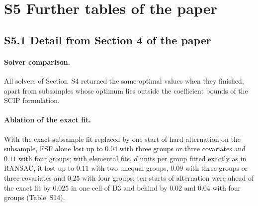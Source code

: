 \clearpage
\section*{S5 Further tables of the paper}

\begin{table}[htbp]
\centering
\small
\caption{Mean flagged fraction $\hat\alpha$ of ESF, by design and fraction of
outliers $\varepsilon$.}
\label{tab:ahat}

\end{table}

\begin{table}[htbp]
\centering
\small
\caption{Computing time per data set in seconds, the first two parts of the study pooled
(without the $\varepsilon=0.30$ cells of the first part, which the second part replaces).
TCLUST-REG ran under GNU Octave, which is slower than MATLAB, so its times overstate its cost
(by a factor of about $36$ against MATLAB Online on the data sets of Table~\ref{tab:matlab}, on different machines) and are indicative only.}
\label{tab:time}

\end{table}

\begin{table}[htbp]
\centering
\scriptsize
\caption{Plan~5: mean accuracy on clean units of ESF alone and of ESF with the
recovery step, the best competitor chosen after the run and the paired difference (standard error in
brackets), and the mean fractions of units flagged by their residuals and by the covariate screen
only ($50$ data sets per cell).}
\label{tab:plan5}
\resizebox{\textwidth}{!}{}
\end{table}

\subsection*{S5.1 Detail from Section 4 of the paper}

\paragraph{Solver comparison.} All solvers of Section~S4 returned the same optimal values when
they finished, apart from subsamples whose optimum lies outside the coefficient bounds of the
SCIP formulation.

\paragraph{Ablation of the exact fit.} With the exact subsample fit replaced by one start of
hard alternation on the subsample, ESF alone lost up to $0.04$ with three groups or three
covariates and $0.11$ with four groups; with elemental fits, $d$ units per group fitted exactly
as in RANSAC, it lost up to $0.11$ with two unequal groups, $0.09$ with three groups or three
covariates and $0.25$ with four groups; ten starts of alternation were ahead of the exact fit by
$0.025$ in one cell of D3 and behind by $0.02$ and $0.04$ with four groups (Table~S14).

